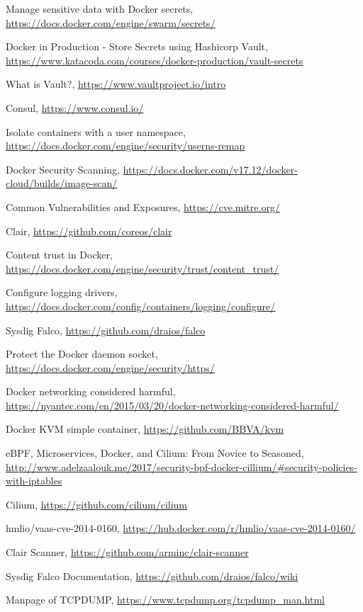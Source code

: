\documentclass[a4paper,12pt]{article}
\begin{document}
\begin{thebibliography}{99}
Manage sensitive data with Docker secrets,
\url{https://docs.docker.com/engine/swarm/secrets/}

Docker in Production - Store Secrets using Hashicorp Vault,
\url{https://www.katacoda.com/courses/docker-production/vault-secrets}

What is Vault?, \url{https://www.vaultproject.io/intro}

Consul, \url{https://www.consul.io/}

Isolate containers with a user namespace,
\url{https://docs.docker.com/engine/security/userns-remap}

Docker Security Scanning,
\url{https://docs.docker.com/v17.12/docker-cloud/builds/image-scan/}

Common Vulnerabilities and Exposures, \url{https://cve.mitre.org/}

Clair, \url{https://github.com/coreos/clair} 

Content trust in Docker,
\url{https://docs.docker.com/engine/security/trust/content_trust/}

Configure logging drivers,
\url{https://docs.docker.com/config/containers/logging/configure/}

Sysdig Falco, \url{https://github.com/draios/falco}

Protect the Docker daemon socket, \url{https://docs.docker.com/engine/security/https/}

Docker networking considered harmful,
\url{https://nyantec.com/en/2015/03/20/docker-networking-considered-harmful/}

Docker KVM simple container, \url{https://github.com/BBVA/kvm}

eBPF, Microservices, Docker, and Cilium: From Novice to Seasoned,
\url{http://www.adelzaalouk.me/2017/security-bpf-docker-cillium/#security-policies-with-iptables}

Cilium, \url{https://github.com/cilium/cilium}

hmlio/vaas-cve-2014-0160, \url{https://hub.docker.com/r/hmlio/vaas-cve-2014-0160/}

Clair Scanner, \url{https://github.com/arminc/clair-scanner}

Sysdig Falco Documentation, \url{https://github.com/draios/falco/wiki}

Manpage of TCPDUMP, \url{https://www.tcpdump.org/tcpdump_man.html}

\end{thebibliography}
\end{document}
